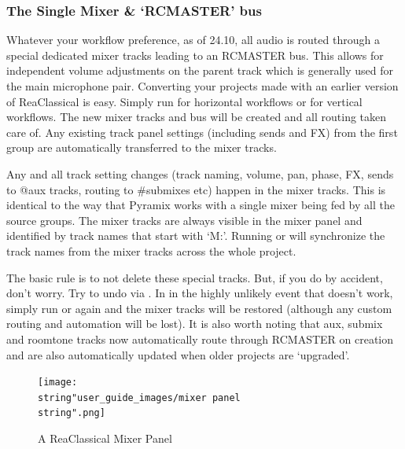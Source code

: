 \documentclass[10pt,american]{article}
\begin{document}
\noindent{}

\subsubsection{The Single Mixer \& \textquoteleft RCMASTER\textquoteright{} bus}

Whatever your workflow preference, as of 24.10, all audio is routed through a
special dedicated mixer tracks leading to an RCMASTER bus. This allows for
independent volume adjustments on the parent track which is generally used for
the main microphone pair. Converting your projects made with an earlier version
of ReaClassical is easy. Simply run  for horizontal workflows or
 for vertical workflows. The new mixer tracks and bus will be created
and all routing taken care of. Any existing track panel settings (including
sends and FX) from the first group are automatically transferred to the mixer
tracks.

Any and all track setting changes (track naming, volume, pan, phase, FX, sends
to @aux tracks, routing to \#submixes etc) happen in the mixer tracks. This is
identical to the way that Pyramix works with a single mixer being fed by all the
source groups. The mixer tracks are always visible in the mixer panel and
identified by track names that start with `M:'. Running  or 
will synchronize the track names from the mixer tracks across the whole project. 

The basic rule is to not delete these special tracks. But, if you do by
accident, don't worry. Try to undo via . In in the highly unlikely
event that doesn't work, simply run  or  again and the mixer
tracks will be restored (although any custom routing and automation will be
lost). It is also worth noting that aux, submix and roomtone tracks now
automatically route through RCMASTER on creation and are also automatically
updated when older projects are `upgraded'.

\begin{figure}
\begin{centering}
\texttt{[image: \\string"user\_guide\_images/mixer panel\\string".png]}
\par\end{centering}
\caption{A ReaClassical Mixer Panel}

\end{figure}
\end{document}

